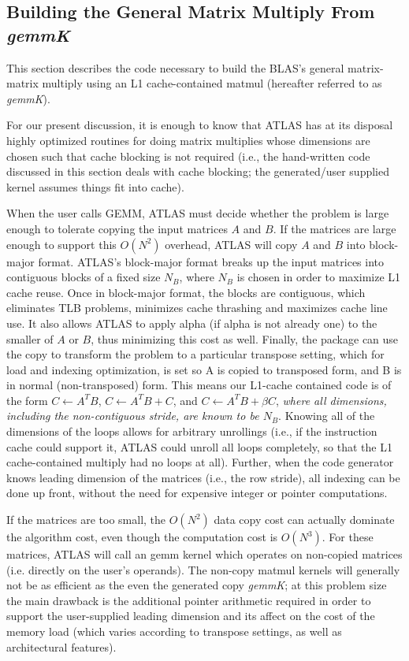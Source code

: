 \documentclass[11pt]{article}
\begin{document}
\subsection{Building the General Matrix Multiply From {\it gemmK}}
\label{sec-buildMM}

This section describes the code necessary to build the BLAS's general
matrix-matrix multiply using an L1 cache-contained
matmul (hereafter referred to as {\it gemmK}).

For our present discussion, it is enough to know
that ATLAS has at its disposal highly optimized routines for doing matrix
multiplies whose dimensions are chosen such that cache blocking is not
required (i.e., the hand-written code discussed in this section deals
with cache blocking; the generated/user supplied kernel assumes things fit
into cache).

When the user calls GEMM, ATLAS must decide whether the problem
is large enough to tolerate copying the input matrices $A$ and $B$.
If the matrices are large enough to support this $O(N^2)$ overhead, ATLAS will
copy $A$ and $B$
into block-major format.  ATLAS's block-major format breaks up the input
matrices into contiguous blocks of a fixed size $N_B$, where $N_B$ is chosen
in order to maximize L1 cache
reuse.  Once in block-major format, the blocks are contiguous, which
eliminates TLB problems, minimizes cache thrashing and maximizes cache line
use.  It also allows ATLAS to apply alpha (if alpha is not already one) to the
smaller of $A$ or $B$, thus minimizing this cost as well.  Finally, the
package can use the copy to transform the problem to a particular transpose
setting, which for load and indexing optimization, is set so
A is copied to transposed form, and B is in normal (non-transposed) form.
This means our L1-cache contained code is of the form
$C \leftarrow A^T B$, $C \leftarrow A^T B + C$,
and $C \leftarrow A^T B + \beta C$,
{\em where all dimensions, including the non-contiguous stride, are known
to be $N_B$}.  Knowing all of the dimensions of the loops allows for
arbitrary unrollings (i.e., if the instruction cache could support it, ATLAS
could unroll all loops completely, so that the L1 cache-contained multiply
had no loops at all).  Further, when the code generator knows leading dimension
of the matrices (i.e., the row stride), all indexing can be done up front,
without the need for expensive integer or pointer computations.

If the matrices are too small, the $O(N^2)$ data copy cost can actually
dominate the algorithm cost, even though the computation cost is $O(N^3)$.
For these matrices, ATLAS will call an gemm kernel which operates on non-copied
matrices (i.e. directly on the user's operands).  The non-copy matmul kernels
will generally not be as efficient as the even the generated copy {\it gemmK};
at this problem
size the main drawback is the additional pointer arithmetic required in order
to support the user-supplied leading dimension and its affect on the cost of
the memory load (which varies according to transpose settings, as well as
architectural features).
\end{document}
